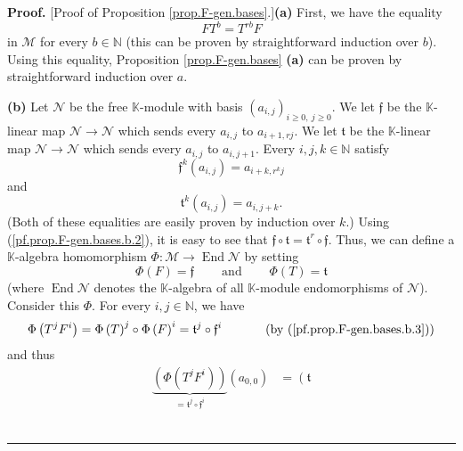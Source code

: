 \documentclass[numbers=enddot,12pt,final,onecolumn,notitlepage]{scrartcl}%
\theoremstyle{definition}
\newenvironment{proof}[1][Proof]{\noindent\textbf{#1.} }{\ \rule{0.5em}{0.5em}}
\begin{document}
\begin{proof}
[Proof of Proposition \ref{prop.F-gen.bases}.]\textbf{(a)} First, we have the
equality
\begin{equation}
FT^{b}=T^{rb}F \label{pf.prop.F-gen.bases.a.1}%
\end{equation}
in $\mathcal{M}$ for every $b\in\mathbb{N}$ (this can be proven by
straightforward induction over $b$). Using this equality, Proposition
\ref{prop.F-gen.bases} \textbf{(a)} can be proven by straightforward induction
over $a$.

\textbf{(b)} Let $\mathcal{N}$ be the free $\mathbb{K}$-module with basis
$\left(  a_{i,j}\right)  _{i\geq0,\ j\geq0}$. We let $\mathfrak{f}$ be the
$\mathbb{K}$-linear map $\mathcal{N}\rightarrow\mathcal{N}$ which sends every
$a_{i,j}$ to $a_{i+1,rj}$. We let $\mathfrak{t}$ be the $\mathbb{K}$-linear
map $\mathcal{N}\rightarrow\mathcal{N}$ which sends every $a_{i,j}$ to
$a_{i,j+1}$. Every $i,j,k\in\mathbb{N}$ satisfy%
\begin{equation}
\mathfrak{f}^{k}\left(  a_{i,j}\right)  =a_{i+k,r^{k}j}
\label{pf.prop.F-gen.bases.b.1}%
\end{equation}
and
\begin{equation}
\mathfrak{t}^{k}\left(  a_{i,j}\right)  =a_{i,j+k}.
\label{pf.prop.F-gen.bases.b.2}%
\end{equation}
(Both of these equalities are easily proven by induction over $k$.) Using
(\ref{pf.prop.F-gen.bases.b.2}), it is easy to see that $\mathfrak{f}%
\circ\mathfrak{t}=\mathfrak{t}^{r}\circ\mathfrak{f}$. Thus, we can define a
$\mathbb{K}$-algebra homomorphism $\Phi:\mathcal{M}\rightarrow
\operatorname*{End}\mathcal{N}$ by setting%
\begin{equation}
\Phi\left(  F\right)  =\mathfrak{f}\ \ \ \ \ \ \ \ \ \ \text{and}%
\ \ \ \ \ \ \ \ \ \ \Phi\left(  T\right)  =\mathfrak{t}
\label{pf.prop.F-gen.bases.b.3}%
\end{equation}
(where $\operatorname*{End}\mathcal{N}$ denotes the $\mathbb{K}$-algebra of
all $\mathbb{K}$-module endomorphisms of $\mathcal{N}$). Consider this $\Phi$.
For every $i,j\in\mathbb{N}$, we have%
\[
\Phi\left(  T^{j}F^{i}\right)  =\Phi\left(  T\right)  ^{j}\circ\Phi\left(
F\right)  ^{i}=\mathfrak{t}^{j}\circ\mathfrak{f}^{i}%
\ \ \ \ \ \ \ \ \ \ \left(  \text{by (\ref{pf.prop.F-gen.bases.b.3})}\right)
\]
and thus%
\begin{align}
\underbrace{\left(  \Phi\left(  T^{j}F^{i}\right)  \right)  }_{=\mathfrak{t}%
^{j}\circ\mathfrak{f}^{i}}\left(  a_{0,0}\right)   &  =\left(  \mathfrak{t}%

\end{align}
\end{proof}
\end{document}
